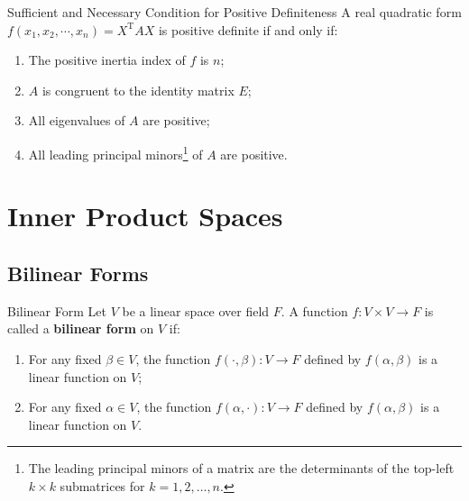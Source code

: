 \documentclass[11pt]{../../TexTemplate/elegantbook} %
\begin{document}
\begin{theorem}{Sufficient and Necessary Condition for Positive Definiteness}
    A real quadratic form \( f( x_{1}, x_{2}, \cdots, x_{n})=X^{\mathrm{T}}AX \) is positive definite if and only if:
    \begin{enumerate}
        \item The positive inertia index of \( f \) is \( n \);
        \item \(A\) is congruent to the identity matrix \( E \);
        \item All eigenvalues of \( A \) are positive;
        \item All leading principal minors\footnote{
            The leading principal minors of a matrix are the determinants of 
            the top-left \( k \times k \) submatrices for \( k = 1, 2, \ldots, n \).
        } of \( A \) are positive.
    \end{enumerate}
    
\end{theorem}

\chapter{Inner Product Spaces}
\section{Bilinear Forms}
\begin{definition}{Bilinear Form}
    Let \( V \) be a linear space over field \( F \).
    A function \( f: V \times V \to F \) is called a \textbf{bilinear form} on \( V \) if:
    \begin{enumerate}
        \item For any fixed \( \beta \in V \), the function \( f(\cdot, \beta): V \to F \) defined by
            \( f(\alpha, \beta) \) is a linear function on \( V \);
        \item For any fixed \( \alpha \in V \), the function \( f(\alpha, \cdot): V \to F \) defined by
            \( f(\alpha, \beta) \) is a linear function on \( V \).
    \end{enumerate}
    
\end{definition}
\end{document}
